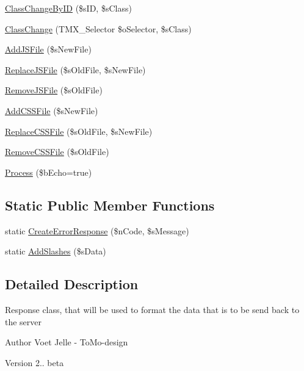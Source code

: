 \begin{DoxyCompactItemize}
\item 
\hyperlink{class_a_j_a_x___response_a83aedd965664793eca47a68de5ac1273}{Class\-Change\-By\-I\-D} (\$s\-I\-D, \$s\-Class)
\item 
\hyperlink{class_a_j_a_x___response_a07e89d4407b8c3d2ace81fd5cb162be5}{Class\-Change} (T\-M\-X\-\_\-\-Selector \$o\-Selector, \$s\-Class)
\item 
\hyperlink{class_a_j_a_x___response_a698c3b7ce0a35fb6dfc31f13073c8fa2}{Add\-J\-S\-File} (\$s\-New\-File)
\item 
\hyperlink{class_a_j_a_x___response_a0a9d5da413c619c7d2820573da104e3a}{Replace\-J\-S\-File} (\$s\-Old\-File, \$s\-New\-File)
\item 
\hyperlink{class_a_j_a_x___response_aeebbe6e31801e025b95b56a5fcff0850}{Remove\-J\-S\-File} (\$s\-Old\-File)
\item 
\hyperlink{class_a_j_a_x___response_a95a747316bd4618b45d438a8bea385f4}{Add\-C\-S\-S\-File} (\$s\-New\-File)
\item 
\hyperlink{class_a_j_a_x___response_a020923f6c33bf4201b0ee0b7509208c3}{Replace\-C\-S\-S\-File} (\$s\-Old\-File, \$s\-New\-File)
\item 
\hyperlink{class_a_j_a_x___response_aca7ea3ab30272291eafe98d41b602700}{Remove\-C\-S\-S\-File} (\$s\-Old\-File)
\item 
\hyperlink{class_a_j_a_x___response_aa23febfae44d7e28875d88dbcd1cd305}{Process} (\$b\-Echo=true)
\end{DoxyCompactItemize}
\subsection*{Static Public Member Functions}
\begin{DoxyCompactItemize}
\item 
static \hyperlink{class_a_j_a_x___response_ad3c0f052bfa7658aa4b8e1dfa1224496}{Create\-Error\-Response} (\$n\-Code, \$s\-Message)
\item 
static \hyperlink{class_a_j_a_x___response_a1dc591d51f6abe3a7026a38efdb2e45c}{Add\-Slashes} (\$s\-Data)
\end{DoxyCompactItemize}


\subsection{Detailed Description}
Response class, that will be used to format the data that is to be send back to the server

\begin{DoxyAuthor}{Author}
Voet Jelle -\/ To\-Mo-\/design 
\end{DoxyAuthor}
\begin{DoxyVersion}{Version}
2.. beta
\end{DoxyVersion}
